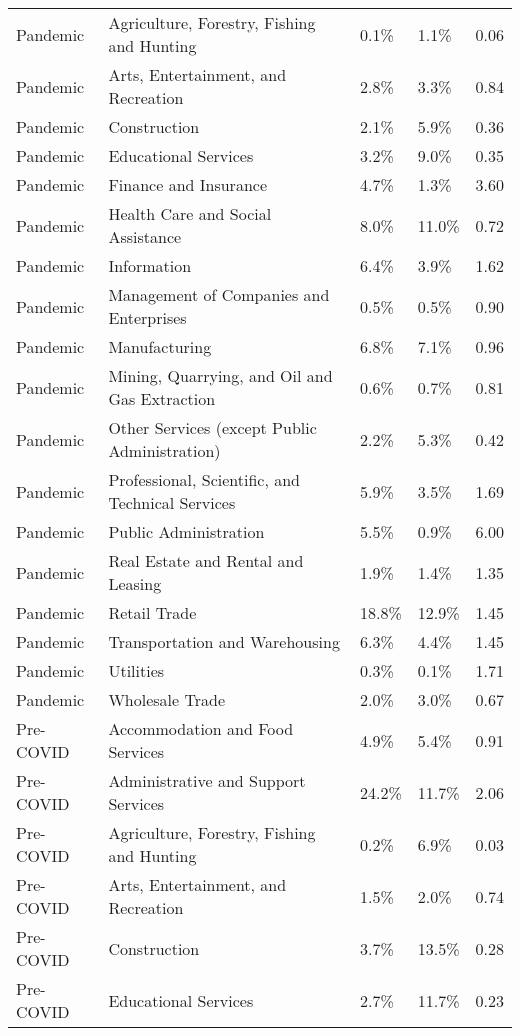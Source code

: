 \begin{tabular}{llllr}
  Pandemic & Agriculture, Forestry, Fishing and Hunting & 0.1\% & 1.1\% & 0.06 \\ 
  Pandemic & Arts, Entertainment, and Recreation & 2.8\% & 3.3\% & 0.84 \\ 
  Pandemic & Construction & 2.1\% & 5.9\% & 0.36 \\ 
  Pandemic & Educational Services & 3.2\% & 9.0\% & 0.35 \\ 
  Pandemic & Finance and Insurance & 4.7\% & 1.3\% & 3.60 \\ 
  Pandemic & Health Care and Social Assistance & 8.0\% & 11.0\% & 0.72 \\ 
  Pandemic & Information & 6.4\% & 3.9\% & 1.62 \\ 
  Pandemic & Management of Companies and Enterprises & 0.5\% & 0.5\% & 0.90 \\ 
  Pandemic & Manufacturing & 6.8\% & 7.1\% & 0.96 \\ 
  Pandemic & Mining, Quarrying, and Oil and Gas Extraction & 0.6\% & 0.7\% & 0.81 \\ 
  Pandemic & Other Services (except Public Administration) & 2.2\% & 5.3\% & 0.42 \\ 
  Pandemic & Professional, Scientific, and Technical Services & 5.9\% & 3.5\% & 1.69 \\ 
  Pandemic & Public Administration & 5.5\% & 0.9\% & 6.00 \\ 
  Pandemic & Real Estate and Rental and Leasing & 1.9\% & 1.4\% & 1.35 \\ 
  Pandemic & Retail Trade & 18.8\% & 12.9\% & 1.45 \\ 
  Pandemic & Transportation and Warehousing & 6.3\% & 4.4\% & 1.45 \\ 
  Pandemic & Utilities & 0.3\% & 0.1\% & 1.71 \\ 
  Pandemic & Wholesale Trade & 2.0\% & 3.0\% & 0.67 \\ 
  Pre-COVID & Accommodation and Food Services & 4.9\% & 5.4\% & 0.91 \\ 
  Pre-COVID & Administrative and Support Services & 24.2\% & 11.7\% & 2.06 \\ 
  Pre-COVID & Agriculture, Forestry, Fishing and Hunting & 0.2\% & 6.9\% & 0.03 \\ 
  Pre-COVID & Arts, Entertainment, and Recreation & 1.5\% & 2.0\% & 0.74 \\ 
  Pre-COVID & Construction & 3.7\% & 13.5\% & 0.28 \\ 
  Pre-COVID & Educational Services & 2.7\% & 11.7\% & 0.23 \\ 

\end{tabular}
